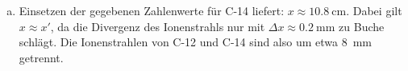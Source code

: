 \begin{enumerate}[(a)]
\item Einsetzen der gegebenen Zahlenwerte für C-14 liefert:
$x\approx \SI{10.8}{\centi\meter}$. Dabei gilt $x\approx x'$, da die Divergenz des Ionenstrahls nur mit $\Delta x\approx \SI{0.2}{\milli\meter}$ zu Buche schlägt. Die Ionenstrahlen von C-12 und C-14 sind also um etwa \SI{8}{\milli\meter} getrennt.
\end{enumerate}